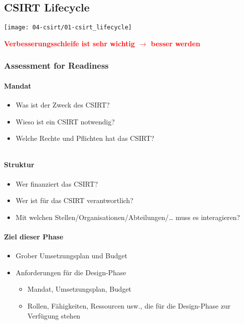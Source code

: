 \subsection{CSIRT Lifecycle}
\begin{center}
    \texttt{[image: 04-csirt/01-csirt\_lifecycle]}
\end{center}

\textbf{\textcolor{red}{Verbesserungsschleife ist sehr wichtig $\rightarrow$ besser werden}}

\subsubsection{Assessment for Readiness}
\begin{minipage}{0.4\linewidth}
    \paragraph{Mandat}
    \begin{itemize}
        \item Was ist der Zweck des CSIRT?
        \item Wieso ist ein CSIRT notwendig?
        \item Welche Rechte und Pflichten hat das CSIRT?
    \end{itemize}
    \vfill
    $ $
\end{minipage}
\begin{minipage}{0.6\linewidth}
    \paragraph{Struktur}
    \begin{itemize}
        \item Wer finanziert das CSIRT?
        \item Wer ist für das CSIRT verantwortlich?
        \item Mit welchen Stellen/Organisationen/Abteilungen/… muss es interagieren?
    \end{itemize}
\end{minipage}

\paragraph{Ziel dieser Phase}
\begin{itemize}
    \item Grober Umsetzungsplan und Budget
    \item Anforderungen für die Design-Phase
    \begin{itemize}
        \item Mandat, Umsetzungsplan, Budget
        \item Rollen, Fähigkeiten, Ressourcen usw., die für die Design-Phase zur Verfügung stehen
    \end{itemize}
\end{itemize}

